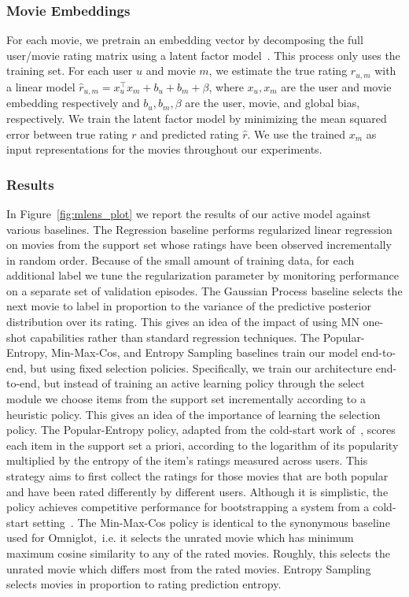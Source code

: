 \subsubsection{Movie Embeddings}
For each movie, we pretrain an embedding vector by decomposing the full user/movie rating matrix using a latent factor model~\citep{koren2010factor}. This process only uses the training set. For each user $u$ and movie $m$, we estimate the true rating $r_{u, m}$ with a linear model $\hat{r}_{u, m} = x_u^\top x_m + b_u + b_m + \beta$, where $x_u, x_m$ are the user and movie embedding respectively and $b_u, b_m, \beta$ are the user, movie, and global bias, respectively. We train the latent factor model by minimizing the mean squared error between true rating $r$ and predicted rating $\hat{r}$. We use the trained $x_m$ as input representations for the movies throughout our experiments.

\subsubsection{Results}
In Figure~\ref{fig:mlens_plot} we report the results of our active model against various baselines.
The Regression baseline performs regularized linear regression on movies from the support set whose ratings have been observed incrementally in random order.
Because of the small amount of training data, for each additional label we tune the regularization parameter by monitoring performance on a separate set of validation episodes.
The Gaussian Process baseline selects the next movie to label in proportion to the variance of the predictive posterior distribution over its rating.
This gives an idea of the impact of using MN one-shot capabilities rather than standard regression techniques.
The Popular-Entropy, Min-Max-Cos, and Entropy Sampling baselines train our model end-to-end, but using fixed selection policies.
Specifically, we train our architecture end-to-end, but instead of training an active learning policy through the select module we choose items from the support set incrementally according to a heuristic policy.
This gives an idea of the importance of learning the selection policy.
The Popular-Entropy policy, adapted from the cold-start work of~\citet{rashid2002getting}, scores each item in the support set a priori, according to the logarithm of its popularity multiplied by the entropy of the item's ratings measured across users.
This strategy aims to first collect the ratings for those movies that are both popular and have been rated differently by different users.
Although it is simplistic, the policy achieves competitive performance for bootstrapping a system from a cold-start setting~\cite{elahi2016survey}.
The Min-Max-Cos policy is identical to the synonymous baseline used for Omniglot,~i.e. it selects the unrated movie which has minimum maximum cosine similarity to any of the rated movies.
Roughly, this selects the unrated movie which differs most from the rated movies. Entropy Sampling selects movies in proportion to rating prediction entropy.


